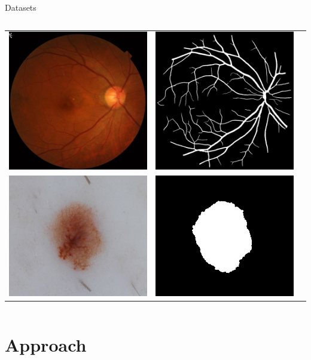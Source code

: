 \documentclass[aspectratio=169,xcolor=dvipsnames]{beamer}
\begin{document}
\begin{frame}{Datasets}
\begin{columns}[c]
\begin{tabular}{ccc}
            \includegraphics[width=.3\textwidth, height=.3\textwidth]{figures/FIVES/images/6_A.png} & 
            \includegraphics[width=.3\textwidth, height=.3\textwidth]{figures/FIVES/mask/6_A.png} \\
            
            \includegraphics[width=.3\textwidth, height=.3\textwidth]{figures/ISIC2016/images/ISIC_0000486.jpg} & 
            \includegraphics[width=.3\textwidth, height=.3\textwidth]{figures/ISIC2016/mask/ISIC_0000486_Segmentation.png} \\
        \end{tabular}
    \end{columns}
\end{frame}



\section{Approach}
\end{document}
